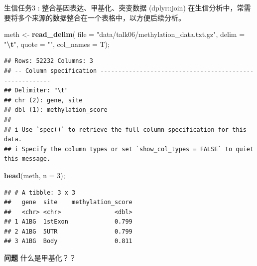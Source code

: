 \documentclass[ignorenonframetext,]{beamer}
\newenvironment{Shaded}{\begin{snugshade}}{\end{snugshade}}
\newcommand{\AttributeTok}[1]{\textcolor[rgb]{0.13,0.29,0.53}{#1}}
\newcommand{\DecValTok}[1]{\textcolor[rgb]{0.00,0.00,0.81}{#1}}
\newcommand{\FunctionTok}[1]{\textcolor[rgb]{0.13,0.29,0.53}{\textbf{#1}}}
\newcommand{\NormalTok}[1]{#1}
\newcommand{\OtherTok}[1]{\textcolor[rgb]{0.56,0.35,0.01}{#1}}
\newcommand{\SpecialCharTok}[1]{\textcolor[rgb]{0.81,0.36,0.00}{\textbf{#1}}}
\newcommand{\StringTok}[1]{\textcolor[rgb]{0.31,0.60,0.02}{#1}}
\newcommand\FontSmall{\fontsize{7}{8}\selectfont}
\newcommand\FontNormal{\fontsize{10}{10}\selectfont}
\begin{document}
\begin{frame}[fragile]{生信任务3 : 整合基因表达、甲基化、突变数据
(dplyr::join)}
\protect\hypertarget{ux751fux4fe1ux4efbux52a13-ux6574ux5408ux57faux56e0ux8868ux8fbeux7532ux57faux5316ux7a81ux53d8ux6570ux636e-dplyrjoin}{}
在生信分析中，常需要将多个来源的数据整合在一个表格中，以方便后续分析。

\FontSmall

\begin{Shaded}
\begin{Highlighting}[]
\NormalTok{meth }\OtherTok{\textless{}{-}} \FunctionTok{read\_delim}\NormalTok{( }\AttributeTok{file =} \StringTok{"data/talk06/methylation\_data.txt.gz"}\NormalTok{, }
                    \AttributeTok{delim =} \StringTok{"}\SpecialCharTok{\textbackslash{}t}\StringTok{"}\NormalTok{, }\AttributeTok{quote =} \StringTok{""}\NormalTok{, }\AttributeTok{col\_names =}\NormalTok{ T);}
\end{Highlighting}
\end{Shaded}

\begin{verbatim}
## Rows: 52232 Columns: 3
## -- Column specification --------------------------------------------------------
## Delimiter: "\t"
## chr (2): gene, site
## dbl (1): methylation_score
## 
## i Use `spec()` to retrieve the full column specification for this data.
## i Specify the column types or set `show_col_types = FALSE` to quiet this message.
\end{verbatim}

\begin{Shaded}
\begin{Highlighting}[]
\FunctionTok{head}\NormalTok{(meth, }\AttributeTok{n =} \DecValTok{3}\NormalTok{);}
\end{Highlighting}
\end{Shaded}

\begin{verbatim}
## # A tibble: 3 x 3
##   gene  site    methylation_score
##   <chr> <chr>               <dbl>
## 1 A1BG  1stExon             0.799
## 2 A1BG  5UTR                0.799
## 3 A1BG  Body                0.811
\end{verbatim}

\FontNormal

\textbf{问题} 什么是甲基化？？
\end{frame}
\end{document}
